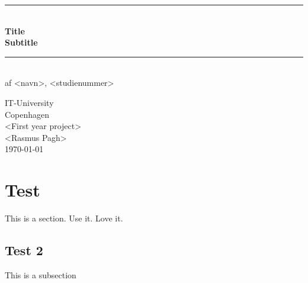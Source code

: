 \documentclass[a4paper,11pt]{article}
\begin{document}
\begin{titlepage}
\centering \parindent=0pt
\newcommand{\HRule}{\rule{\textwidth}{1mm}}
 \HRule\\[1cm]\Huge\bfseries
Title\\[0.7cm]
\large Subtitle\\[1cm]
\HRule\\[4cm]  \large af <navn>, <studienummer>\\
 \normalsize %
\begin{flushleft}
IT-University\\
Copenhagen\\
<First year project>\\
<Rasmus Pagh>\\
\today \end{flushleft}
\end{titlepage}

\tableofcontents
\pagebreak

\section{Test}

This is a section. Use it. Love it.

\subsection{Test 2}

This is a subsection
\end{document}
